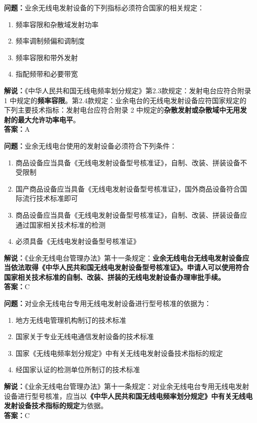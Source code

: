 \documentclass{ctexbook}
\begin{document}
\bigskip


\noindent\textbf{问题：}业余无线电发射设备的下列指标必须符合国家的相关规定：
\begin{enumerate}[label=\Alph*), leftmargin=3em]
	\item 频率容限和杂散域发射功率
	\item 频率调制频偏和调制度
	\item 频率容限和带外发射
	\item 指配频带和必要带宽
\end{enumerate}
\noindent\textbf{解说：}《中华人民共和国无线电频率划分规定》第2.3款规定：发射电台应符合附录 1 中规定的\textbf{频率容限}。第2.4款规定：业余电台的无线电发射设备应符国家规定的下列主要技术指标：发射电台应符合附录 2 中规定的\textbf{杂散发射或杂散域中无用发射的最大允许功率电平}。\\\noindent\textbf{答案：}A



\bigskip


\noindent\textbf{问题：}业余无线电台使用的发射设备必须符合下列条件：
\begin{enumerate}[label=\Alph*), leftmargin=3em]
	\item 商品设备应当具备《无线电发射设备型号核准证》，自制、改装、拼装设备不受限制
	\item 国产商品设备应当具备《无线电发射设备型号核准证》，国外商品设备符合国际流行技术标准即可
	\item 商品设备应当具备《无线电发射设备型号核准证》，自制、改装、拼装设备应通过国家相关技术标准的检测
	\item 必须具备《无线电发射设备型号核准证》
\end{enumerate}
\noindent\textbf{解说：}《业余无线电台管理办法》第十一条规定：\textbf{业余无线电台无线电发射设备应当依法取得《中华人民共和国无线电发射设备型号核准证》。申请人可以使用符合国家相关技术标准的自制、改装、拼装的无线电发射设备办理审批手续。}\\\noindent\textbf{答案：}C



\bigskip


\noindent\textbf{问题：}对业余无线电台专用无线电发射设备进行型号核准的依据为：
\begin{enumerate}[label=\Alph*), leftmargin=3em]
	\item 地方无线电管理机构制订的技术标准
	\item 国家关于专业无线电通信发射设备的技术标准
	\item 国家《无线电频率划分规定》中有关无线电发射设备技术指标的规定
	\item 经国家认证的检测单位所制订的技术标准
\end{enumerate}
\noindent\textbf{解说：}《业余无线电台管理办法》第十一条规定：对业余无线电台专用无线电发射设备进行型号核准，应当以\textbf{《中华人民共和国无线电频率划分规定》中有关无线电发射设备技术指标的规定}为依据。\\\noindent\textbf{答案：}C
\end{document}

